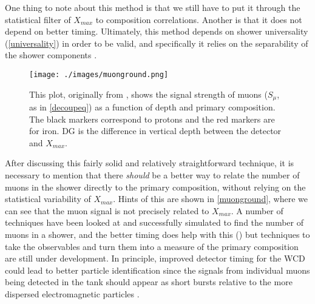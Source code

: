 One thing to note about this method is that we still have to put it through the statistical filter of $X_{max}$ to composition correlations. Another is that it does not depend on better timing. Ultimately, this method depends on shower universality (\autoref{universality}) in order to be valid, and specifically it relies on the separability of the shower components \cite{primepdr,univpart}.
\begin{center}
\begin{figure}[H]
\texttt{[image: ./images/muonground.png]}
\caption[Muon Content vs. Primary Over Depth]{This plot, originally from \cite{primeuniv}, shows the signal strength of muons ($S_{\mu}$, as in \autoref{decoupeq}) as a function of depth and primary composition. The black markers correspond to protons and the red markers are for iron. DG is the difference in vertical depth between the detector and $X_{max}$.}
\label{muonground}
\end{figure}
\end{center}
After discussing this fairly solid and relatively straightforward technique, it is necessary to mention that there \textit{should} be a better way to relate the number of muons in the shower directly to the primary composition, without relying on the statistical variability of $X_{max}$. Hints of this are shown in \autoref{muonground}, where we can see that the muon signal is not precisely related to $X_{max}$. A number of techniques have been looked at and successfully simulated to find the number of muons in a shower, and the better timing does help with this (\cite{mupart, primeuniv}) but techniques to take the observables and turn them into a measure of the primary composition are still under development. In principle, improved detector timing for the WCD could lead to better particle identification since the signals from individual muons being detected in the tank should appear as short bursts relative to the more dispersed electromagnetic particles \cite{mupart}.%


